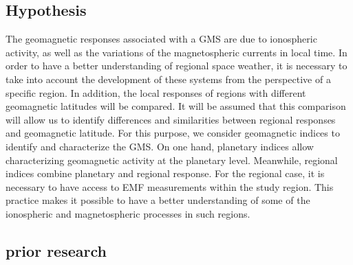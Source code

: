 \documentclass[12pt]{article}
\begin{document}
\subsection{Hypothesis}
The geomagnetic responses associated with a GMS are due to ionospheric activity, as well as the variations of the magnetospheric currents in local time. In order to have a better understanding of regional space weather, it is necessary to take into account the development of these systems from the perspective of a specific region. In addition, the local responses of regions with different geomagnetic latitudes will be compared. It will be assumed that this comparison will allow us to identify differences and similarities between regional responses and geomagnetic latitude. For this purpose, we consider geomagnetic indices to identify and characterize the GMS. On one hand, planetary indices allow characterizing geomagnetic activity at the planetary level. Meanwhile, regional indices combine planetary and regional response. For the regional case, it is necessary to have access to EMF measurements within the study region. This practice makes it possible to have a better understanding of some of the ionospheric and magnetospheric processes in such regions.\\

\subsection{prior research}
\end{document}

